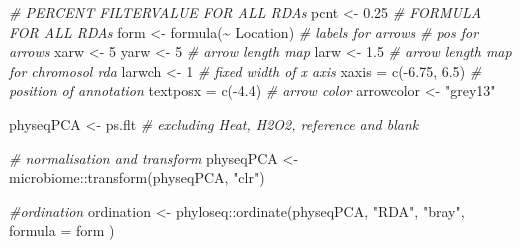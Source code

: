 \documentclass[
]{book}
\newenvironment{Shaded}{\begin{snugshade}}{\end{snugshade}}
\newcommand{\AttributeTok}[1]{\textcolor[rgb]{0.77,0.63,0.00}{#1}}
\newcommand{\CommentTok}[1]{\textcolor[rgb]{0.56,0.35,0.01}{\textit{#1}}}
\newcommand{\DecValTok}[1]{\textcolor[rgb]{0.00,0.00,0.81}{#1}}
\newcommand{\FloatTok}[1]{\textcolor[rgb]{0.00,0.00,0.81}{#1}}
\newcommand{\FunctionTok}[1]{\textcolor[rgb]{0.00,0.00,0.00}{#1}}
\newcommand{\NormalTok}[1]{#1}
\newcommand{\OtherTok}[1]{\textcolor[rgb]{0.56,0.35,0.01}{#1}}
\newcommand{\SpecialCharTok}[1]{\textcolor[rgb]{0.00,0.00,0.00}{#1}}
\newcommand{\StringTok}[1]{\textcolor[rgb]{0.31,0.60,0.02}{#1}}
\begin{document}
\begin{Shaded}
\begin{Highlighting}[]
\CommentTok{\# PERCENT FILTERVALUE FOR ALL RDAs}
\NormalTok{pcnt }\OtherTok{\textless{}{-}} \FloatTok{0.25}
\CommentTok{\# FORMULA FOR ALL RDAs}
\NormalTok{form }\OtherTok{\textless{}{-}} \FunctionTok{formula}\NormalTok{(}\SpecialCharTok{\textasciitilde{}}\NormalTok{ Location)}
\CommentTok{\# labels for arrows}
\CommentTok{\# pos for arrows}
\NormalTok{xarw }\OtherTok{\textless{}{-}} \DecValTok{5}
\NormalTok{yarw }\OtherTok{\textless{}{-}} \DecValTok{5}
\CommentTok{\# arrow length map}
\NormalTok{larw }\OtherTok{\textless{}{-}} \FloatTok{1.5}
\CommentTok{\# arrow length map for chromosol rda}
\NormalTok{larwch }\OtherTok{\textless{}{-}} \DecValTok{1}
\CommentTok{\# fixed width of x axis}
\NormalTok{xaxis }\OtherTok{=} \FunctionTok{c}\NormalTok{(}\SpecialCharTok{{-}}\FloatTok{6.75}\NormalTok{, }\FloatTok{6.5}\NormalTok{)}
\CommentTok{\# position of annotation}
\NormalTok{textposx }\OtherTok{=} \FunctionTok{c}\NormalTok{(}\SpecialCharTok{{-}}\FloatTok{4.4}\NormalTok{)}
\CommentTok{\# arrow color}
\NormalTok{arrowcolor }\OtherTok{\textless{}{-}} \StringTok{"grey13"}


\NormalTok{physeqPCA }\OtherTok{\textless{}{-}}\NormalTok{ ps.flt }\CommentTok{\# excluding Heat, H2O2, reference and blank}

\CommentTok{\# normalisation and transform}
\NormalTok{physeqPCA }\OtherTok{\textless{}{-}}\NormalTok{ microbiome}\SpecialCharTok{::}\FunctionTok{transform}\NormalTok{(physeqPCA, }\StringTok{"clr"}\NormalTok{)}

\CommentTok{\#ordination}
\NormalTok{ordination }\OtherTok{\textless{}{-}}\NormalTok{ phyloseq}\SpecialCharTok{::}\FunctionTok{ordinate}\NormalTok{(physeqPCA, }\StringTok{"RDA"}\NormalTok{, }\StringTok{"bray"}\NormalTok{, }\AttributeTok{formula =}\NormalTok{ form )}


\end{Highlighting}
\end{Shaded}
\end{document}
